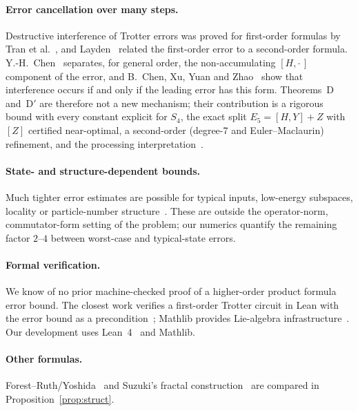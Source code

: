 \documentclass[11pt]{article}
\newcommand{\lb}[1]{[#1]}
\theoremstyle{plain}
\theoremstyle{definition}
\theoremstyle{remark}
\begin{document}
\paragraph{Error cancellation over many steps.} Destructive interference of Trotter errors was proved for
first-order formulas by Tran et al.~\cite{Tran2020}, and Layden~\cite{Layden2022} related the first-order
error to a second-order formula. Y.-H.~Chen~\cite{ChenYH2025} separates, for general order, the
non-accumulating $[H,\cdot\,]$ component of the error, and B.~Chen, Xu, Yuan and Zhao~\cite{ChenXuYuanZhao2026}
show that interference occurs if and only if the leading error has this form. Theorems~D and~D$'$ are
therefore not a new mechanism; their contribution is a rigorous bound with every constant explicit for
$S_4$, the exact split $E_5=[H,Y]+Z$ with $\lb Z$ certified near-optimal, a second-order (degree-7 and
Euler--Maclaurin) refinement, and the processing interpretation~\cite{BlanesCasasRos1999}.

\paragraph{State- and structure-dependent bounds.} Much tighter error estimates are possible for
typical inputs, low-energy subspaces, locality or particle-number
structure~\cite{HeylHaukeZoller2019,Kivlichan2020,SuHuangCampbell2021,SahinogluSomma2021,ChenHKT2021,Zhao2022,YiCrosson2022,ChenBrandao2024,Burgarth2024,ZhaoZhouChilds2025}.
These are outside the operator-norm, commutator-form setting of the problem; our numerics quantify the
remaining factor $2$--$4$ between worst-case and typical-state errors.

\paragraph{Formal verification.} We know of no prior machine-checked proof of a higher-order product
formula error bound. The closest work verifies a first-order Trotter circuit in Lean with the error bound
as a precondition~\cite{QEDIA2026}; Mathlib provides Lie-algebra infrastructure~\cite{Nash2021,Mathlib2020}.
Our development uses Lean~4~\cite{Lean4} and Mathlib.

\paragraph{Other formulas.} Forest--Ruth/Yoshida~\cite{ForestRuth1990,Yoshida1990} and Suzuki's fractal
construction~\cite{Suzuki1990,Suzuki1991} are compared in Proposition~\ref{prop:struct}.
\end{document}
